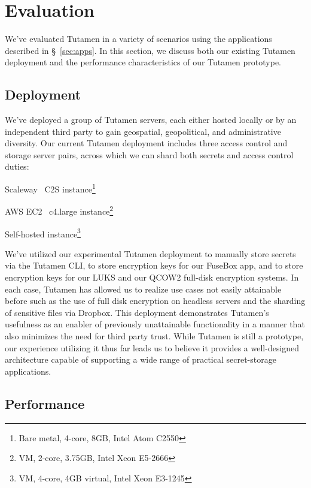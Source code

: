 \section{Evaluation}
\label{sec:eval}

We've evaluated Tutamen in a variety of scenarios using the
applications described in \S~\ref{sec:apps}. In this section, we
discuss both our existing Tutamen deployment and the performance
characteristics of our Tutamen prototype.

\subsection{Deployment}
\label{sec:eval:deployment}

We've deployed a group of Tutamen servers, each either hosted locally
or by an independent third party to gain geospatial, geopolitical, and
administrative diversity. Our current Tutamen deployment includes
three access control and storage server pairs, across which we can
shard both secrets and access control duties:

\begin{packed_desc}
\item[Paris:] Scaleway~\cite{scaleway} C2S instance\footnote{Bare
  metal, 4-core, 8GB, Intel Atom C2550}
\item[North Virginia:] AWS EC2~\cite{amazon-ec2} c4.large
  instance\footnote{VM, 2-core, 3.75GB, Intel Xeon E5-2666}
\item[Boulder:] Self-hosted instance\footnote{VM, 4-core, 4GB virtual,
  Intel Xeon E3-1245}
\end{packed_desc}

We've utilized our experimental Tutamen deployment to manually store
secrets via the Tutamen CLI, to store encryption keys for our FuseBox
app, and to store encryption keys for our LUKS and our QCOW2 full-disk
encryption systems. In each case, Tutamen has allowed us to realize
use cases not easily attainable before such as the use of full disk
encryption on headless servers and the sharding of sensitive files via
Dropbox. This deployment demonstrates Tutamen's usefulness as an
enabler of previously unattainable functionality in a manner that also
minimizes the need for third party trust. While Tutamen is still a
prototype, our experience utilizing it thus far leads us to believe it
provides a well-designed architecture capable of supporting a wide
range of practical secret-storage applications.

\subsection{Performance}
\label{sec:eval:perf}

